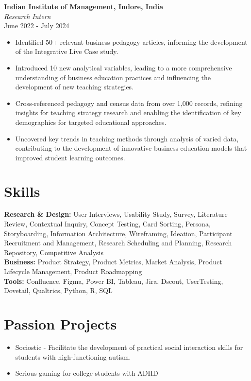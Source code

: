 \documentclass[a4paper,10pt]{article}
\begin{document}
\textbf{Indian Institute of Management, Indore, India} \\
\textit{Research Intern} \\
June 2022 - July 2024
\begin{itemize}[left=0.15cm]
    \item Identified 50+ relevant business pedagogy articles, informing the development of the Integrative Live Case study.
    \item Introduced 10 new analytical variables, leading to a more comprehensive understanding of business education practices and influencing the development of new teaching strategies.
    \item Cross-referenced pedagogy and census data from over 1,000 records, refining insights for teaching strategy research and enabling the identification of key demographics for targeted educational approaches.
    \item Uncovered key trends in teaching methods through analysis of varied data, contributing to the development of innovative business education models that improved student learning outcomes.
\end{itemize}

\vspace{0.3cm}
\section*{Skills}
\textbf{Research \& Design:} User Interviews, Usability Study, Survey, Literature Review, Contextual Inquiry, Concept Testing, Card Sorting, Persona, Storyboarding, Information Architecture, Wireframing, Ideation, Participant Recruitment and Management, Research Scheduling and Planning, Research Repository, Competitive Analysis \\
\textbf{Business:} Product Strategy, Product Metrics, Market Analysis, Product Lifecycle Management, Product Roadmapping \\
\textbf{Tools:} Confluence, Figma, Power BI, Tableau, Jira, Dscout, UserTesting, Dovetail, Qualtrics, Python, R, SQL

\vspace{0.3cm}
\section*{Passion Projects}
\begin{itemize}[left=0.15cm]
    \item Sociostic - Facilitate the development of practical social interaction skills for students with high-functioning autism.
    \item Serious gaming for college students with ADHD
\end{itemize}
\end{document}
